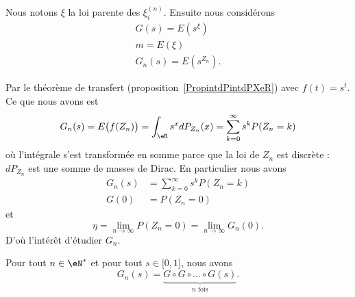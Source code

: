 Nous notons \( \xi\) la loi parente des \( \xi_i^{(n)}\). Ensuite nous considérons
\begin{subequations}
	\begin{align}
		G(s)=E(s^{\xi}) \\
		m=E(\xi)        \\
		G_n(s)=E(s^{Z_n}).
	\end{align}
\end{subequations}

Par le théorème de transfert (proposition~\ref{PropintdPintdPXeR}) avec \( f(t)=s^t\). Ce que nous avons est
\begin{equation}        \label{EqNRtXdC}
	G_n(s)=E\big( f(Z_n) \big)=\int_{\eR}s^xdP_{Z_n}(x)=\sum_{k=0}^{\infty}s^kP(Z_n=k)
\end{equation}
où l'intégrale s'est transformée en somme parce que la loi de \( Z_n\) est discrète : \( dP_{Z_n}\) est une somme de masses de Dirac. En particulier nous avons
\begin{subequations}
	\begin{align}
		G_n(s) & =\sum_{k=0}^{\infty}s^kP(Z_n=k) \\
		G(0)   & =P(Z_n=0)
	\end{align}
\end{subequations}
et
\begin{equation}
	\eta=\lim_{n\to \infty} P(Z_n=0)=\lim_{n\to \infty} G_n(0).
\end{equation}
D'où l'intérêt d'étudier \( G_n\).

\begin{lemma}       \label{LemezrOiI}
	Pour tout \( n\in \eN^*\) et pour tout \( s\in\mathopen[ 0 , 1 \mathclose]\), nous avons
	\begin{equation}
		G_n(s)=\underbrace{G\circ G\circ\ldots\circ G(s)}_{ n\text{ fois}}.
	\end{equation}
\end{lemma}

